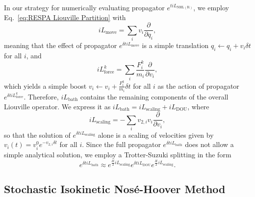 \documentclass[
    journal=jctcce,
    layout=twocolumn
]{achemso}
\newcommand{\diff}[2]{\frac{\partial #2}{\partial #1}} %
\newcommand{\dof}{i}   %
\newcommand{\Liu}{i\!L}
\begin{document}
In our strategy for numerically evaluating propagator $e^{t \Liu_\mathrm{NHL(R)}}$, we employ Eq.~\eqref{eq:RESPA Liouville Partition} with
\begin{equation}
\Liu_\mathrm{move} = \sum_\dof v_\dof \diff{q_\dof}{},
\end{equation}
meaning that the effect of propagator $e^{\delta t \Liu_\mathrm{move}}$ is a simple translation $q_\dof \leftarrow q_\dof + v_\dof \delta t$ for all $\dof$, and
\begin{equation}
\Liu_\mathrm{force}^k = \sum_\dof \frac{F_\dof^k}{m_\dof} \diff{v_\dof}{},
\end{equation}
which yields a simple boost $v_\dof \leftarrow v_\dof + \frac{F_\dof^k}{m_\dof} \delta t$ for all $\dof$ as the action of propagator $e^{\delta t \Liu_\mathrm{force}^k}$.
Therefore, $\Liu_\mathrm{bath}$ contains the remaining components of the overall Liouville operator.
We express it as $\Liu_\mathrm{bath} = \Liu_\mathrm{scaling} + \Liu_\mathrm{DOU}$, where
\begin{equation}
\Liu_\mathrm{scaling} = -\sum_\dof v_{2,\dof} v_\dof \diff{v_\dof}{},
\end{equation}
so that the solution of $e^{\delta t \Liu_\mathrm{scaling}}$ alone is a scaling of velocities given by $v_\dof(t) = v_\dof^0 e^{-v_{2,\dof} \delta t}$ for all $\dof$.
Since the full propagator $e^{\delta t \Liu_\mathrm{bath}}$ does not allow a simple analytical solution, we employ a Trotter-Suzuki splitting in the form
\begin{equation*}
e^{\delta t \Liu_\mathrm{bath}} \approx
e^{\frac{\delta t}{2} \Liu_\mathrm{scaling}}
e^{\delta t \Liu_\mathrm{DOU}}
e^{\frac{\delta t}{2} \Liu_\mathrm{scaling}}.
\end{equation*}

\subsection{Stochastic Isokinetic Nos\'e-Hoover Method}
\end{document}
